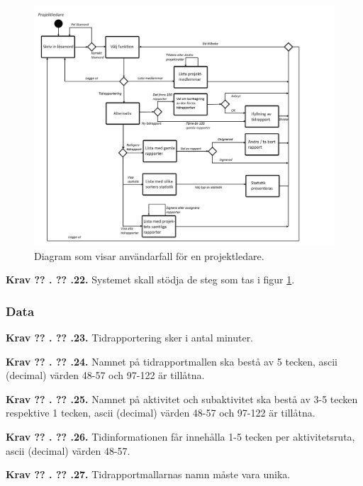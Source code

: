 \documentclass[a4paper]{article}
\newcommand\getcurrentref[1]{%
 \ifnumequal{\value{#1}}{0}
  {??}
  {\the\value{#1}}%
}
\newcommand\requirement[2]{
	\numberedrow{Krav}{#1}{#2}
}
\newcommand\numberedrow[3]{
	\noindent
	\textbf{#1 \getcurrentref{section}.\getcurrentref{subsection}.#2.} #3
	
}
\begin{document}
			\begin{figure}[H]
				\centering
				\includegraphics[width=\textwidth]{flow_time_proj_leader}
				\caption{Diagram som visar användarfall för en projektledare.}
				\label{image_time_proboss}
			\end{figure}
		\requirement{22}{Systemet skall stödja de steg som tas i figur \ref{image_time_proboss}.}

		\subsubsection*{Data}
			\requirement{23}{Tidrapportering sker i antal minuter.}
			\requirement{24}{Namnet på tidrapportmallen ska bestå av 5 tecken, ascii (decimal) värden 48-57 och 97-122 är tillåtna.}
			\requirement{25}{Namnet på aktivitet och subaktivitet ska bestå av 3-5 tecken respektive 1 tecken, ascii (decimal) värden 48-57 och 97-122 är tillåtna.}

			\requirement{26}{Tidinformationen får innehålla 1-5 tecken per aktivitetsruta, ascii (decimal) värden 48-57.}
			\requirement{27}{Tidrapportmallarnas namn måste vara unika. }
 	 	 		
\end{document}
